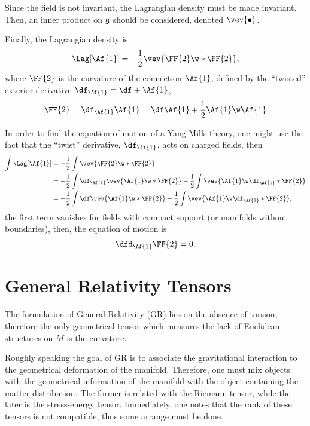 Since the field is not invariant, the Lagrangian density must be made invariant. Then, an inner product on $\frak{g}$ should be considered, denoted $\vev{\bullet}$.

Finally, the Lagrangian density is
\begin{align}
  \Lag[\Af{1}] =-\frac{1}{2} \vev{\FF{2}\w*\FF{2}},
\end{align}
where $\FF{2}$ is the curvature of the connection $\Af{1}$, defined by the ``twisted'' exterior derivative $\df_{\Af{1}}= \df +\Af{1}$,
\begin{align}
  \FF{2}= \df_{\Af{1}}\Af{1}= \df\Af{1} +\frac{1}{2}\Af{1}\w\Af{1}
\end{align}


\begin{WEbox}[frametitle={Equations of Motion for Yang-Mills Theories},
  frametitlerule=true,
  frametitlealignment=\centering,
  frametitleaboveskip=10pt,]
  In order to find the equation of motion of a Yang-Mills theory, one might use the fact that the ``twist'' derivative, $\df_{\Af{1}}$, acts on charged fields, then
  \begin{align*}
    \int \Lag[\Af{1}] &=-\frac{1}{2}\int \vev{\FF{2}\w*\FF{2}}\\
    &=-\frac{1}{2}\int \df_{\Af{1}}\vev{\Af{1}\w*\FF{2}}-\frac{1}{2}\int \vev{\Af{1}\w\df_{\Af{1}}*\FF{2}}\\
    &=-\frac{1}{2}\int \df\vev{\Af{1}\w*\FF{2}}-\frac{1}{2}\int \vev{\Af{1}\w\df_{\Af{1}}*\FF{2}},
  \end{align*}
  the first term vanishes for fields with compact support (or manifolds without boundaries), then, the equation of motion is 
  \begin{align*}
    \dfd_{\Af{1}}\FF{2} =0.
  \end{align*}
\end{WEbox}
   




\section{General Relativity Tensors}

The formulation of General Relativity (GR) lies on the absence of torsion, therefore the only geometrical tensor which measures the lack of Euclidean structures on $M$ is the curvature.

Roughly speaking the goal of GR is to associate the gravitational interaction to the geometrical deformation of the manifold. Therefore, one must mix objects with the geometrical information of the manifold with the object containing the matter distribution. The former is related with the Riemann tensor, while the later is the stress-energy tensor. Immediately, one notes that the rank of these tensors is not compatible, thus some arrange must be done.

